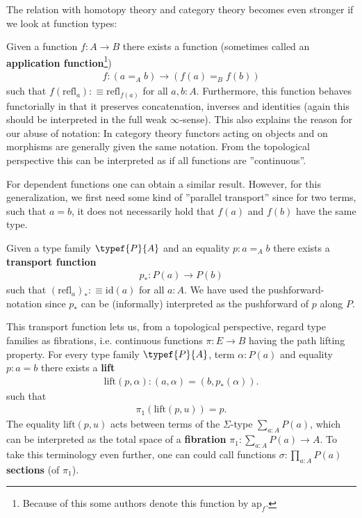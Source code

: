     The relation with homotopy theory and category theory becomes even stronger if we look at function types:
    \begin{property}
        Given a function $f:A\rightarrow B$ there exists a function (sometimes called an \textbf{application function}\footnote{Because of this some authors denote this function by $\text{ap}_f$.})
        \begin{gather}
            f:(a=_Ab)\rightarrow(f(a)=_Bf(b))
        \end{gather}
        such that $f(\text{refl}_a):\equiv\text{refl}_{f(a)}$ for all $a, b:A$. Furthermore, this function behaves functorially in that it preserves concatenation, inverses and identities (again this should be interpreted in the full weak $\infty$-sense). This also explains the reason for our abuse of notation: In category theory functors acting on objects and on morphisms are generally given the same notation. From the topological perspective this can be interpreted as if all functions are ''continuous''.
    \end{property}
    For dependent functions one can obtain a similar result. However, for this generalization, we first need some kind of ''parallel transport'' since for two terms, such that $a=b$, it does not necessarily hold that $f(a)$ and $f(b)$ have the same type.
    \begin{property}[Transport]
        Given a type family $\typef{P}{A}$ and an equality $p:a=_Ab$  there exists a \textbf{transport function}
        \begin{gather}
            p_*:P(a)\rightarrow P(b)
        \end{gather}
        such that $(\text{refl}_a)_*:\equiv\text{id}(a)$ for all $a:A$. We have used the pushforward-notation since $p_*$ can be (informally) interpreted as the pushforward of $p$ along $P$.

        This transport function lets us, from a topological perspective, regard type families as fibrations, i.e. continuous functions $\pi:E\rightarrow B$ having the path lifting property. For every type family $\typef{P}{A}$, term $\alpha:P(a)$ and equality $p:a=b$ there exists a \textbf{lift}
        \begin{gather}
            \text{lift}(p, \alpha):(a, \alpha) = (b, p_*(\alpha)).
        \end{gather}
        such that
        \begin{gather}
            \pi_1(\text{lift}(p, u))=p.
        \end{gather}
        The equality $\text{lift}(p, u)$ acts between terms of the $\Sigma$-type $\sum_{a:A}P(a)$, which can be interpreted as the total space of a \textbf{fibration} $\pi_1:\sum_{a:A}P(a)\rightarrow A$. To take this terminology even further, one can could call functions $\sigma:\prod_{a:A}P(a)$ \textbf{sections} (of $\pi_1$).
    \end{property}
